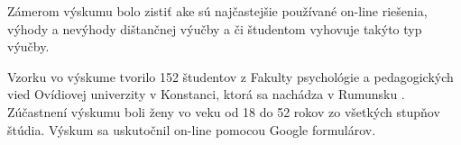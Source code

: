 \documentclass[10pt,oneside,slovak,a4paper]{article}
\begin{document}
Zámerom výskumu bolo zistiť ake sú najčastejšie používané on-line riešenia, výhody a nevýhody dištančnej výučby a či študentom vyhovuje takýto typ výučby. \cite{covid19} 


Vzorku vo výskume tvorilo 152 študentov z Fakulty psychológie a pedagogických vied Ovídiovej univerzity v Konstanci, ktorá sa nachádza v Rumunsku \cite{covid19}.
Zúčastnení výskumu boli ženy vo veku od 18 do 52 rokov zo všetkých stupňov štúdia.
Výskum sa uskutočnil on-line pomocou Google formulárov. %
\end{document}
